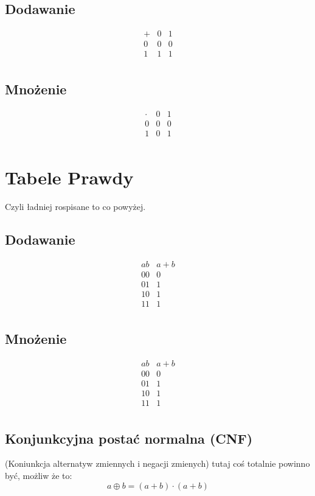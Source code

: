 \documentclass{article}
\begin{document}
\subsection{Dodawanie}
\[
	\begin{array}{c|c|c}
		+ & 0 & 1 \\
		\hline
		0 & 0 & 0 \\
		\hline
		1 & 1 & 1 \\
	\end{array}
\]

\subsection{Mnożenie}
\[
	\begin{array}{c|c|c}
		\cdot & 0 & 1 \\
		\hline
		0     & 0 & 0 \\
		\hline
		1     & 0 & 1 \\
	\end{array}
\]

\section{Tabele Prawdy}
Czyli ładniej rospisane to co powyżej.
\subsection{Dodawanie}
\[\begin{array}{c|c}
		a b & a + b \\
		\hline
		00  & 0     \\
		01  & 1     \\
		10  & 1     \\
		11  & 1     \\
	\end{array}\]
\subsection{Mnożenie}
\[
	\begin{array}{c|c}
		a b & a + b \\
		\hline
		00  & 0     \\
		01  & 1     \\
		10  & 1     \\
		11  & 1     \\
	\end{array}
\]
\subsection{Konjunkcyjna postać normalna (CNF)}
(Koniunkcja alternatyw zmiennych i negacji zmienych)
tutaj coś totalnie powinno być, możliw że to: 
	\[a \oplus b = (a + b) \cdot (a + b) \]
\end{document}
